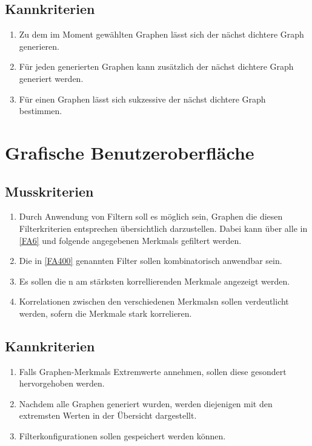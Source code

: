 \documentclass[13pt]{scrreprt}
\newcounter{tempcounter1}
\newcounter{tempcounter2}
\newcounter{tempcounter3}
\newcounter{tempcounter4}
\newcounter{tempcounter5}
\newcounter{tempcounter6}
\newcounter{tempcounter7}
\newcounter{tempcounter8}
\newcounter{tempcounter9}
\begin{document}
\addtocounter{tempcounter5}{1}
\subsection{Kannkriterien}
\begin{addmargin}[25pt]{0pt}
\begin{enumerate}[label=FA\arabic*,start=\value{tempcounter5}]
	\item Zu dem im Moment gewählten Graphen lässt sich der nächst dichtere Graph generieren.
	\item Für jeden generierten Graphen kann zusätzlich der nächst dichtere Graph generiert werden.
	\item Für einen Graphen lässt sich sukzessive der nächst dichtere Graph bestimmen.
\end{enumerate}
\end{addmargin}


\section{Grafische Benutzeroberfläche}
\subsection{Musskriterien}
\begin{addmargin}[25pt]{0pt}
\begin{enumerate} [label=FA\arabic*,start=400]
	\item \label{FA400}Durch Anwendung von Filtern soll es möglich sein, Graphen die diesen Filterkriterien entsprechen übersichtlich darzustellen. Dabei kann über alle in \ref{FA6} und folgende angegebenen \Glspl{Merkmal} gefiltert werden.	
	\item \label{FA401}Die in \ref{FA400} genannten Filter sollen kombinatorisch anwendbar sein.
	\item Es sollen die n am stärksten korrellierenden Merkmale angezeigt werden.
	\item Korrelationen zwischen den verschiedenen \Glspl{Merkmal}n sollen verdeutlicht werden, sofern die Merkmale stark korrelieren.
\setcounter{tempcounter6}{\value{enumi}}
\end{enumerate}
\end{addmargin}

\addtocounter{tempcounter6}{1}
\subsection{Kannkriterien}
\begin{addmargin}[25pt]{0pt}
\begin{enumerate} [label=FA\arabic*,start=\value{tempcounter6}]
		\item Falls Graphen-\Glspl{Merkmal} Extremwerte annehmen, sollen diese gesondert hervorgehoben werden.
		\item Nachdem alle Graphen generiert wurden, werden diejenigen mit den extremsten Werten in der Übersicht dargestellt.
		\item Filterkonfigurationen sollen gespeichert werden können.
\end{enumerate}
\end{addmargin}
\end{document}
